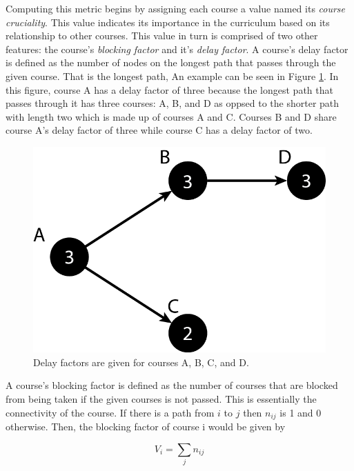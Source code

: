 \documentclass[botnum, fleqn]{unmeethesis}
\begin{document}
Computing this metric begins by assigning each course a value named its \textit{course cruciality}. This value indicates its importance in the curriculum based on its relationship to other courses. This value in turn is comprised of two other features: the course's \textit{blocking factor} and it's \textit{delay factor}. A course's delay factor is defined as the number of nodes on the longest path that passes through the given course. That is the longest path, An example can be seen in Figure \ref{fig:delay_factor_example}. In this figure, course A has a delay factor of three because the longest path that passes through it has three courses: A, B, and D as oppsed to the shorter path with length two which is made up of courses A and C. Courses B and D share course A's delay factor of three while course C has a delay factor of two.

\begin{figure}[h!]
\centerline{\includegraphics[scale=0.4]{./figures/delay_factor.png}}
\caption{Delay factors are given for courses A, B, C, and D.} 
\label{fig:delay_factor_example}
\end{figure}

A course's blocking factor is defined as the number of courses that are blocked from being taken if the given courses is not passed. This is essentially the connectivity of the course. If there is a path from \(i\) to \(j\) then \(n_{ij}\) is 1 and 0 otherwise. Then, the blocking factor of course i would be given by

\begin{equation}
  V_{i} = \sum_{j} n_{ij}
\end{equation}
\end{document}
